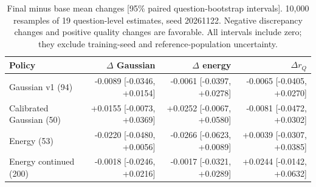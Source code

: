 \begin{table}[htbp]
\centering\scriptsize
\caption{Final minus base mean changes [95\% paired question-bootstrap intervals]. 10,000 resamples of 19 question-level estimates, seed 20261122. Negative discrepancy changes and positive quality changes are favorable. All intervals include zero; they exclude training-seed and reference-population uncertainty.}\label{tab:semantic-ci-new}
\begin{tabular}{@{}lrrr@{}}
\toprule
Policy & $\Delta$ Gaussian & $\Delta$ energy & $\Delta r_Q$\\
\midrule
Gaussian v1 (94) & -0.0089 [-0.0346, +0.0154] & -0.0061 [-0.0397, +0.0278] & -0.0065 [-0.0405, +0.0270]\\
Calibrated Gaussian (50) & +0.0155 [-0.0073, +0.0369] & +0.0252 [-0.0067, +0.0580] & -0.0081 [-0.0472, +0.0302]\\
Energy (53) & -0.0220 [-0.0480, +0.0056] & -0.0266 [-0.0623, +0.0089] & +0.0039 [-0.0307, +0.0385]\\
Energy continued (200) & -0.0018 [-0.0246, +0.0216] & -0.0017 [-0.0321, +0.0289] & +0.0244 [-0.0142, +0.0632]\\
\bottomrule
\end{tabular}
\end{table}
